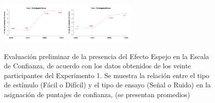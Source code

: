 \documentclass[a4paper ]{article}
\begin{document}
\begin{figure}[th]
\includegraphics[width=0.3\textwidth]{Figures/MirrorRating_Exp1_P19} \includegraphics[width=0.3\textwidth]{Figures/MirrorRating_Exp1_P20} 
\caption[Puntaje de confianza promedio por tipo de estímulo (A-B) y tipo de ensayo (S-N); Experimento 1]{Evaluación preliminar de la presencia del Efecto Espejo en la Escala de Confianza, de acuerdo con los datos obtenidos de los veinte participantes del Experimento 1. Se muestra la relación entre el tipo de estímulo (Fácil o Difícil) y el tipo de ensayo (Señal o Ruido) en la asignación de puntajes de confianza, (se presentan promedios)}
\label{fig:MERating_E1}
\end{figure}
\end{document}
